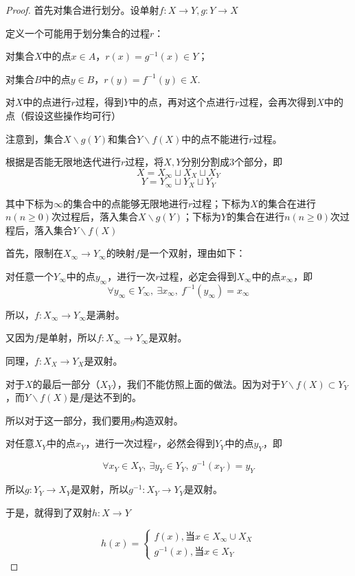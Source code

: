 \begin{proof}
    首先对集合进行划分。设单射$f:X\rightarrow Y,g:Y\rightarrow X$

    定义一个可能用于划分集合的过程$r$：

    对集合$X$中的点$x\in A$，$r(x) = g^{-1}(x) \in Y$；

    对集合$B$中的点$y\in B$，$r(y) = f^{-1}(y) \in X$.

    对$X$中的点进行$r$过程，得到$Y$中的点，再对这个点进行$r$过程，会再次得到$X$中的点（假设这些操作均可行）

    注意到，集合$X\backslash g(Y)$和集合$Y\backslash f(X)$中的点不能进行$r$过程。

    根据是否能无限地迭代进行$r$过程，将$X,Y$分别分割成3个部分，即
    \[ X= X_\infty \sqcup X_X \sqcup X_Y\]
    \[Y = Y_\infty \sqcup Y_X \sqcup Y_Y\]

    其中下标为$\infty$的集合中的点能够无限地进行$r$过程；下标为$X$的集合在进行$n(n\geq 0)$次过程后，落入集合$X\backslash g(Y)$；下标为$Y$的集合在进行$n(n\geq 0)$次过程后，落入集合$Y\backslash f(X)$

    首先，限制在$X_\infty \rightarrow Y_\infty$的映射$f$是一个双射，理由如下：

    对任意一个$Y_\infty$中的点$y_\infty$，进行一次$r$过程，必定会得到$X_\infty$中的点$x_\infty$，即
    \[\forall y_\infty \in Y_\infty,\ \exists x_\infty ,\ f^{-1}\left(y_\infty \right) = x_\infty\]
    
    所以，$f:X_\infty \rightarrow Y_\infty$是满射。

    又因为$f$是单射，所以$f:X_\infty \rightarrow Y_\infty$是双射。

    同理，$f: X_X \rightarrow Y_X$是双射。

    对于$X$的最后一部分（$X_Y$），我们不能仿照上面的做法。因为对于$Y \backslash f(X) \subset Y_Y$，而$Y \backslash f(X)$是$f$是达不到的。

    所以对于这一部分，我们要用$g$构造双射。

    对任意$X_Y$中的点$x_Y$，进行一次过程$r$，必然会得到$Y_Y$中的点$y_Y$，即

    \[\forall x_Y \in X_Y,\ \exists y_Y\in Y_Y,\ g^{-1}(x_Y) = y_Y \]

    所以$g: Y_Y\rightarrow X_Y$是双射，所以$g^{-1}:X_Y \rightarrow Y_Y$是双射。

    于是，就得到了双射$h:X\rightarrow Y$

    \begin{equation*}
        h(x) =
    \begin{cases}
         f(x), \text{当}x\in X_\infty \cup X_X \\
         g^{-1}(x),\text{当}x\in X_Y
    \end{cases}
    \end{equation*}

\end{proof}

